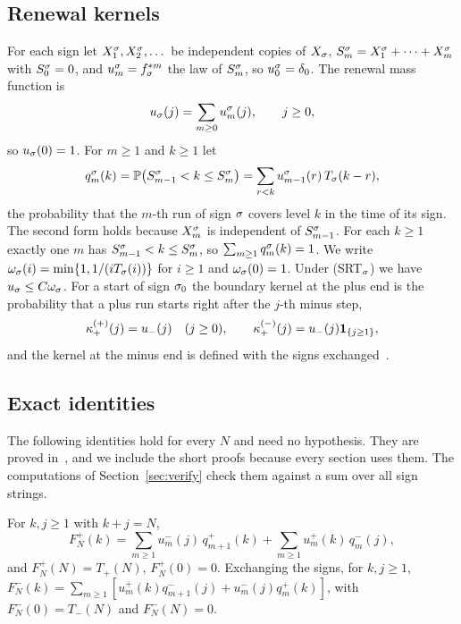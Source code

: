 \subsection{Renewal kernels}\label{sec:kernels}

For each sign let $X^\sigma_1,X^\sigma_2,\dots$ be independent copies of $X_\sigma$,
$S^\sigma_m=X^\sigma_1+\dots+X^\sigma_m$ with $S^\sigma_0=0$, and $u^\sigma_m=f_\sigma^{*m}$ the
law of $S^\sigma_m$, so $u^\sigma_0=\delta_0$. The renewal mass function is
\[
 u_\sigma(j)=\sum_{m\ge0}u^\sigma_m(j),\qquad j\ge0,
\]
so $u_\sigma(0)=1$. For $m\ge1$ and $k\ge1$ let
\begin{equation}\label{eq:q-cover}
 q^\sigma_m(k)=\mathbb{P}\bigl(S^\sigma_{m-1}<k\le S^\sigma_m\bigr)=\sum_{r<k}u^\sigma_{m-1}(r)\,T_\sigma(k-r),
\end{equation}
the probability that the $m$-th run of sign $\sigma$ covers level $k$ in the time of
its sign. The second form holds because $X^\sigma_m$ is independent of $S^\sigma_{m-1}$.
For each $k\ge1$ exactly one $m$ has $S^\sigma_{m-1}<k\le S^\sigma_m$, so
$\sum_{m\ge1}q^\sigma_m(k)=1$. We write $\omega_\sigma(i)=\min\{1,1/(iT_\sigma(i))\}$ for
$i\ge1$ and $\omega_\sigma(0)=1$. Under (SRT$_\sigma$) we have $u_\sigma\le C\omega_\sigma$. For a
start of sign $\sigma_0$ the boundary kernel at the plus end is the probability that a plus
run starts right after the $j$-th minus step,
\begin{equation}\label{eq:kappa-fresh}
 \kappa^{({+})}_{+}(j)=u_{-}(j)\quad(j\ge0),\qquad
 \kappa^{({-})}_{+}(j)=u_{-}(j)\mathbf{1}_{\{j\ge1\}},
\end{equation}
and the kernel at the minus end is defined with the signs exchanged~\cite[Section~2.4]{paperF}.

\subsection{Exact identities}\label{sec:identities}

The following identities hold for every $N$ and need no hypothesis. They are proved
in~\cite[Section~2]{paperF}, and we include the short proofs because every section
uses them. The computations of Section~\ref{sec:verify} check them against a sum over
all sign strings.

\begin{proposition}\label{prop:fresh-identity}
For $k,j\ge1$ with $k+j=N$,
\begin{equation}\label{eq:fresh}
 F^\plus_N(k)=\sum_{m\ge1}u^\minus_m(j)\,q^\plus_{m+1}(k)+\sum_{m\ge1}u^\plus_m(k)\,q^\minus_m(j),
\end{equation}
and $F^\plus_N(N)=T_\plus(N)$, $F^\plus_N(0)=0$. Exchanging the signs, for $k,j\ge1$,
$F^\minus_N(k)=\sum_{m\ge1}[u^\plus_m(k)q^\minus_{m+1}(j)+u^\minus_m(j)q^\plus_m(k)]$,
with $F^\minus_N(0)=T_\minus(N)$ and $F^\minus_N(N)=0$.
\end{proposition}

